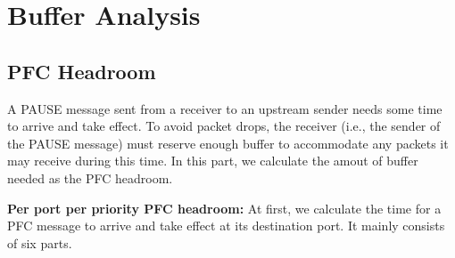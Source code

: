 \section{Buffer Analysis}\label{sec:sol}

\subsection{PFC Headroom}\label{subsec:pfcheadroom}


A PAUSE message sent from a receiver to an upstream sender needs some time to arrive and take effect. To avoid packet drops, the receiver (i.e., the sender of the PAUSE message) must reserve enough buffer to accommodate any packets it may receive during this time. In this part, we calculate the amout of buffer needed as the PFC headroom.

\textbf{ Per port per priority PFC headroom:} At first, we calculate the time for a PFC message to arrive and take effect at its destination port. It mainly consists of six parts.

